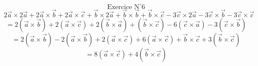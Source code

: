 \documentclass{article}
\begin{document}
\[ \text{Exercice N}^\circ \text{6} \]
\[ 2\vec{a} \times 2\vec{a} + 2\vec{a} \times \vec{b} + 2\vec{a} \times \vec{c} + \vec{b} \times 2\vec{a} + \vec{b} \times \vec{b} + \vec{b} \times \vec{c} -3\vec{c} \times 2\vec{a} - 3\vec{c} \times \vec{b} - 3\vec{c} \times \vec{c} \]
\[ = 2(\vec{a} \times \vec{b}) + 2(\vec{a} \times \vec{c}) + 2(\vec{b} \times \vec{a}) + (\vec{b} \times \vec{c}) - 6(\vec{c} \times \vec{a}) - 3(\vec{c} \times \vec{b}) \]
\[ = 2(\vec{a} \times \vec{b}) - 2(\vec{a} \times \vec{b}) + 2(\vec{a} \times \vec{c}) + 6(\vec{a} \times \vec{c}) + \vec{b} \times \vec{c} + 3(\vec{b} \times \vec{c}) \]
\[ = 8(\vec{a} \times \vec{c}) + 4(\vec{b} \times \vec{c}) \]
\end{document}
